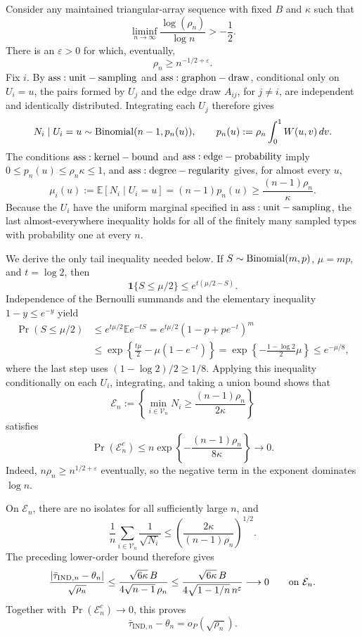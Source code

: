 Consider any maintained triangular-array sequence with fixed \(B\) and \(\kappa\) such that
\[
 \liminf_{n\to\infty}\frac{\log(\rho_n)}{\log n}>-\frac12.
\]
There is an \(\varepsilon>0\) for which, eventually,
\[
 \rho_n\ge n^{-1/2+\varepsilon}.
\]
Fix \(i\).  By \({\rm ass:unit-sampling}\) and \({\rm ass:graphon-draw}\), conditional only on \(U_i=u\), the pairs formed by \(U_j\) and the edge draw \(A_{ij}\), for \(j\ne i\), are independent and identically distributed.  Integrating each \(U_j\) therefore gives
\[
 N_i\mid U_i=u\sim{\rm Binomial}(n-1,p_n(u)),
 \qquad
 p_n(u):=\rho_n\int_0^1W(u,v)\,dv.
\]
The conditions \({\rm ass:kernel-bound}\) and \({\rm ass:edge-probability}\) imply \(0\le p_n(u)\le\rho_n\kappa\le1\), and \({\rm ass:degree-regularity}\) gives, for almost every \(u\),
\[
 \mu_i(u):=\mathbb E[N_i\mid U_i=u]
 =(n-1)p_n(u)
 \ge\frac{(n-1)\rho_n}{\kappa}.
\]
Because the \(U_i\) have the uniform marginal specified in \({\rm ass:unit-sampling}\), the last almost-everywhere inequality holds for all of the finitely many sampled types with probability one at every \(n\).

We derive the only tail inequality needed below.  If \(S\sim{\rm Binomial}(m,p)\), \(\mu=mp\), and \(t=\log2\), then
\[
 \mathbf1\{S\le\mu/2\}\le e^{t(\mu/2-S)}.
\]
Independence of the Bernoulli summands and the elementary inequality \(1-y\le e^{-y}\) yield
\[
\begin{aligned}
 \Pr(S\le\mu/2)
 &\le e^{t\mu/2}\mathbb Ee^{-tS}
 =e^{t\mu/2}(1-p+pe^{-t})^m\\
 &\le\exp\!\left\{\frac{t\mu}{2}-\mu(1-e^{-t})\right\}
 =\exp\!\left\{-\frac{1-\log2}{2}\mu\right\}
 \le e^{-\mu/8},
\end{aligned}
\]
where the last step uses \((1-\log2)/2\ge1/8\).  Applying this inequality conditionally on each \(U_i\), integrating, and taking a union bound shows that
\[
 \mathcal E_n:=\left\{\min_{i\in\mathcal V_n}N_i
 \ge\frac{(n-1)\rho_n}{2\kappa}\right\}
\]
satisfies
\[
 \Pr(\mathcal E_n^c)
 \le n\exp\!\left\{-\frac{(n-1)\rho_n}{8\kappa}\right\}
 \longrightarrow0.
\]
Indeed, \(n\rho_n\ge n^{1/2+\varepsilon}\) eventually, so the negative term in the exponent dominates \(\log n\).

On \(\mathcal E_n\), there are no isolates for all sufficiently large \(n\), and
\[
 \frac1n\sum_{i\in\mathcal V_n}\frac1{\sqrt{N_i}}
 \le\left(\frac{2\kappa}{(n-1)\rho_n}\right)^{1/2}.
\]
The preceding lower-order bound therefore gives
\[
 \frac{|\bar\tau_{\mathrm{IND},n}-\theta_n|}{\sqrt{\rho_n}}
 \le\frac{\sqrt{6\kappa}\,B}{4\sqrt{n-1}\,\rho_n}
 \le\frac{\sqrt{6\kappa}\,B}{4\sqrt{1-1/n}\,n^\varepsilon}
 \longrightarrow0
 \qquad\hbox{on }\mathcal E_n.
\]
Together with \(\Pr(\mathcal E_n^c)\to0\), this proves
\[
 \bar\tau_{\mathrm{IND},n}-\theta_n=o_P(\sqrt{\rho_n}).
\]

